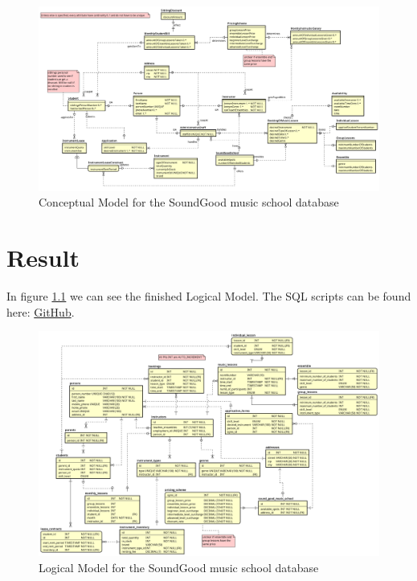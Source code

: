 \documentclass[a4paper]{scrreprt}
\begin{document}
\begin{figure}[h]
    \begin{center}
        \includegraphics[width=\textwidth]{../img/conceptualModel.v1.0.1.png}
        \caption{Conceptual Model for the SoundGood music school database}
        \label{fig:conceptualModel}
    \end{center}
\end{figure}


\chapter{Result}
\label{sec:result}
In figure \ref{fig:logicalModel} we can see the finished Logical Model. The SQL scripts can be found here:
 \href{https://github.com/adrian-jonsson-sjoedin/IV1351-Datalagring/tree/main/project/SQL}{GitHub}.


\begin{figure}[h]
    \begin{center}
        \includegraphics[width=\textwidth]{../img/LogicalModel.png}
        \caption{Logical Model for the SoundGood music school database}
        \label{fig:logicalModel}
    \end{center}
\end{figure}
\end{document}

